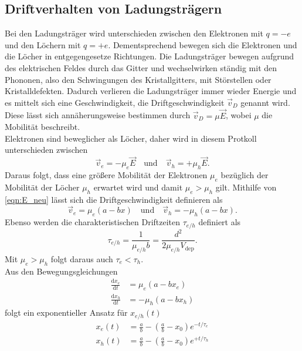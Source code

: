 \subsection{Driftverhalten von Ladungsträgern}
\label{sec:drift}
Bei den Ladungsträger wird unterschieden zwischen den Elektronen mit $q = -e$ und den Löchern mit $q = +e$. Dementsprechend bewegen sich die Elektronen und die Löcher in entgegengesetze Richtungen. Die Ladungsträger bewegen aufgrund des elektrischen Feldes durch das Gitter und wechselwirken ständig mit den Phononen, also den Schwingungen des Kristallgitters, mit Störstellen oder Kristalldefekten. Dadurch verlieren die Ladungsträger immer wieder Energie und es mittelt sich eine Geschwindigkeit, die Driftgeschwindigkeit $\vec{v}_D$ genannt wird. Diese lässt sich annäherungsweise bestimmen durch $\vec{v}_D = \mu \vec{E}$, wobei $\mu$ die Mobilität beschreibt.\\
Elektronen sind beweglicher als Löcher, daher wird in diesem Protkoll unterschieden zwischen
\begin{equation}
    \vec{v}_e = - \mu_e \vec{E} \quad \text{und} \quad \vec{v}_h = + \mu_h \vec{E}.
    \label{eqn:v_D}
\end{equation}
Daraus folgt, dass eine größere Mobilität der Elektronen $\mu_e$ bezüglich der Mobilität der Löcher $\mu_h$ erwartet wird und damit $\mu_e > \mu_h$ gilt. Mithilfe von \autoref{eqn:E_neu} lässt sich die Driftgeschwindigkeit definieren als
\begin{equation}
    \vec{v}_e = \mu_e \left(a - b x\right) \quad \text{und} \quad \vec{v}_h = - \mu_h \left(a - b x\right).
    \label{eqn:v_neu}
\end{equation}
Ebenso werden die charakteristischen Driftzeiten $\tau_{e/h}$ definiert als
\begin{equation}
    \tau_{e/h} = \frac{1}{\mu_{e/h}b}=\frac{d^2}{2 \mu_{e/h} V_{\text{dep}}}.
    \label{eqn:t_D}
\end{equation}
Mit $\mu_e > \mu_h$ folgt daraus auch $\tau_e < \tau_h$.\\
Aus den Bewegungsgleichungen
\begin{align*}
    \frac{\text{d}x_e}{\text{d}t} &= \mu_e \left(a-b x_e\right)\\
    \frac{\text{d}x_h}{\text{d}t} &= - \mu_h \left(a-b x_h\right)
\end{align*}
folgt ein exponentieller Ansatz für $x_{e/h}\left(t\right)$
\begin{align*}
    x_e\left(t\right) &= \frac{a}{b}-\left(\frac{a}{b}-x_0\right)e^{-t/\tau_e} \\
    x_h\left(t\right) &= \frac{a}{b}-\left(\frac{a}{b}-x_0\right)e^{+t/\tau_h}
\end{align*}
